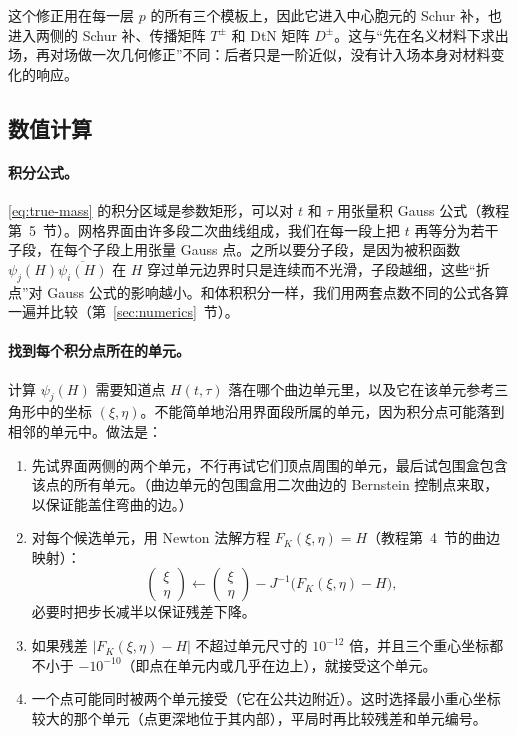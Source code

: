 \documentclass[11pt,a4paper,fontset=fandol]{ctexart}
\begin{document}
这个修正用在每一层 $p$ 的所有三个模板上，因此它进入中心胞元的 Schur 补，也进入两侧的 Schur 补、传播矩阵 $T^\pm$ 和 DtN 矩阵 $D^\pm$。这与“先在名义材料下求出场，再对场做一次几何修正”不同：后者只是一阶近似，没有计入场本身对材料变化的响应。

\subsection{数值计算}

\paragraph{积分公式。} \eqref{eq:true-mass} 的积分区域是参数矩形，可以对 $t$ 和 $\tau$ 用张量积 Gauss 公式（教程第~5~节）。网格界面由许多段二次曲线组成，我们在每一段上把 $t$ 再等分为若干子段，在每个子段上用张量 Gauss 点。之所以要分子段，是因为被积函数 $\psi_j(H)\overline{\psi_i(H)}$ 在 $H$ 穿过单元边界时只是连续而不光滑，子段越细，这些“折点”对 Gauss 公式的影响越小。和体积积分一样，我们用两套点数不同的公式各算一遍并比较（第~\ref{sec:numerics}~节）。

\paragraph{找到每个积分点所在的单元。} 计算 $\psi_j(H)$ 需要知道点 $H(t,\tau)$ 落在哪个曲边单元里，以及它在该单元参考三角形中的坐标 $(\xi,\eta)$。不能简单地沿用界面段所属的单元，因为积分点可能落到相邻的单元中。做法是：
\begin{enumerate}
\item 先试界面两侧的两个单元，不行再试它们顶点周围的单元，最后试包围盒包含该点的所有单元。（曲边单元的包围盒用二次曲边的 Bernstein 控制点来取，以保证能盖住弯曲的边。）
\item 对每个候选单元，用 Newton 法解方程 $F_K(\xi,\eta)=H$（教程第~4~节的曲边映射）：
\[
\begin{pmatrix}\xi\\ \eta\end{pmatrix}\leftarrow\begin{pmatrix}\xi\\ \eta\end{pmatrix}-J^{-1}\bigl(F_K(\xi,\eta)-H\bigr),
\]
必要时把步长减半以保证残差下降。
\item 如果残差 $|F_K(\xi,\eta)-H|$ 不超过单元尺寸的 $10^{-12}$ 倍，并且三个重心坐标都不小于 $-10^{-10}$（即点在单元内或几乎在边上），就接受这个单元。
\item 一个点可能同时被两个单元接受（它在公共边附近）。这时选择最小重心坐标较大的那个单元（点更深地位于其内部），平局时再比较残差和单元编号。
\end{enumerate}
\end{document}
